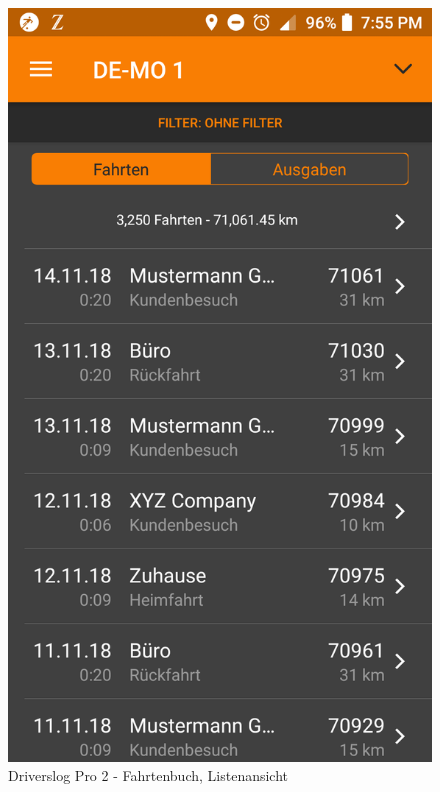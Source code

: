\begin{figure}[H]%
    \begin{minipage}[b]{.4\linewidth} %
        \includegraphics[scale=0.14]{img/pro1}
        \caption{\label{img:img/pro1}Driverslog Pro 2 - Fahrtenbuch, Listenansicht}
    \end{minipage}
    \hspace{0.1\linewidth}%
    \begin{minipage}[b]{.4\linewidth} %

\end{minipage}
\end{figure}
